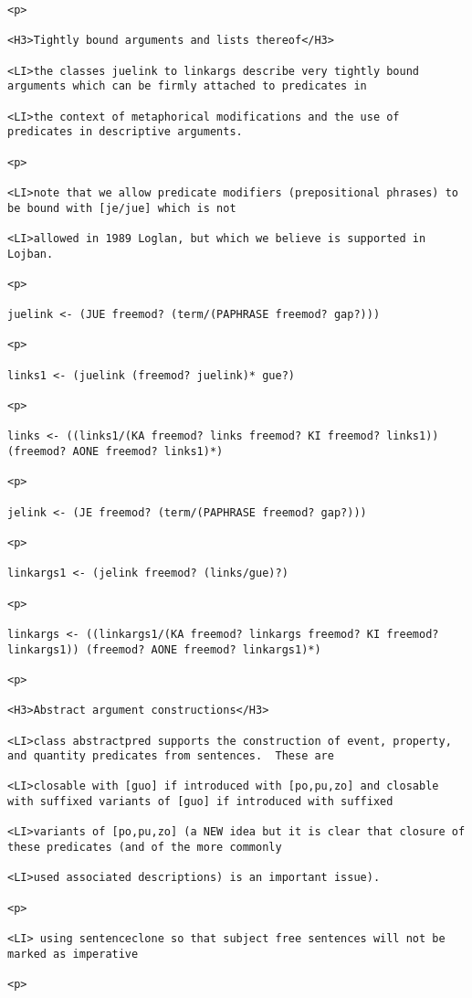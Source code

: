 \documentclass[12pt]{article}
\begin{document}
\begin{lstlisting}
<p>

<H3>Tightly bound arguments and lists thereof</H3>

<LI>the classes juelink to linkargs describe very tightly bound arguments which can be firmly attached to predicates in

<LI>the context of metaphorical modifications and the use of predicates in descriptive arguments.

<p>

<LI>note that we allow predicate modifiers (prepositional phrases) to be bound with [je/jue] which is not

<LI>allowed in 1989 Loglan, but which we believe is supported in Lojban.

<p>

juelink <- (JUE freemod? (term/(PAPHRASE freemod? gap?)))

<p>

links1 <- (juelink (freemod? juelink)* gue?)

<p>

links <- ((links1/(KA freemod? links freemod? KI freemod? links1)) (freemod? AONE freemod? links1)*)

<p>

jelink <- (JE freemod? (term/(PAPHRASE freemod? gap?)))

<p>

linkargs1 <- (jelink freemod? (links/gue)?)

<p>

linkargs <- ((linkargs1/(KA freemod? linkargs freemod? KI freemod? linkargs1)) (freemod? AONE freemod? linkargs1)*)

<p>

<H3>Abstract argument constructions</H3>

<LI>class abstractpred supports the construction of event, property, and quantity predicates from sentences.  These are

<LI>closable with [guo] if introduced with [po,pu,zo] and closable with suffixed variants of [guo] if introduced with suffixed

<LI>variants of [po,pu,zo] (a NEW idea but it is clear that closure of these predicates (and of the more commonly

<LI>used associated descriptions) is an important issue).

<p>

<LI> using sentenceclone so that subject free sentences will not be marked as imperative

<p>


\end{lstlisting}
\end{document}

